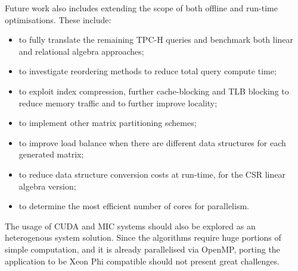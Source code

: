 Future work also includes extending the scope of both offline and run-time optimisations. These include:
\begin{itemize} 
\item to fully translate the remaining TPC-H queries and benchmark both linear and relational algebra approaches;
\item to investigate reordering methods to reduce total query compute time;
\item to exploit index compression, further cache-blocking and TLB blocking to reduce memory traffic and to further improve locality;
\item to implement other matrix partitioning schemes;
\item to improve load balance when there are different data structures for each generated matrix;
\item to reduce data structure conversion costs at run-time, for the CSR linear algebra version;
\item to determine the most efficient number of cores for parallelism.
\end{itemize}

The usage of CUDA and MIC systems should also be explored as an heterogenous system solution. Since the algorithms require huge portions of simple computation, and it is already parallelised via OpenMP, porting the application to be Xeon Phi compatible should not present great challenges.\par 


 

